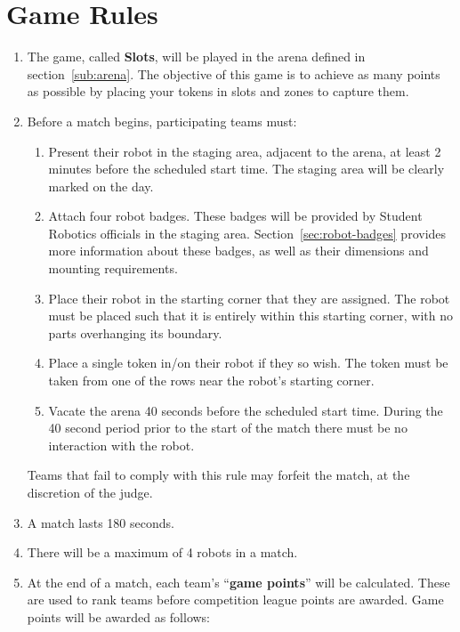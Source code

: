 \section {Game Rules}
\label{game-rules}

\begin{enumerate}
\item The game, called \textbf{Slots}, will be played in the arena defined in section~\ref{sub:arena}.
      The objective of this game is to achieve as many points as possible by placing your tokens in slots and zones to capture them.

\item Before a match begins, participating teams must:
\begin {enumerate}
  \item Present their robot in the staging area, adjacent to the arena, at least 2 minutes before the scheduled start time.
        The staging area will be clearly marked on the day.

  \item Attach four robot badges.
        These badges will be provided by Student Robotics officials in the staging area.
        Section~\ref{sec:robot-badges} provides more information about these badges, as well as their dimensions and mounting requirements.

  \item Place their robot in the starting corner that they are assigned.
        The robot must be placed such that it is entirely within this starting corner, with no parts overhanging its boundary.

  \item Place a single token in/on their robot if they so wish.
        The token must be taken from one of the rows near the robot's starting corner.

  \item Vacate the arena 40 seconds before the scheduled start time.
        During the 40 second period prior to the start of the match there must be no interaction with the robot.
\end{enumerate}
  Teams that fail to comply with this rule may forfeit the match, at the discretion of the judge.

\item A match lasts 180 seconds.

\item There will be a maximum of 4 robots in a match.

\item At the end of a match, each team's ``\textbf{game points}'' will be calculated.
      These are used to rank teams before competition league points are awarded.
      Game points will be awarded as follows:


\end{enumerate}

